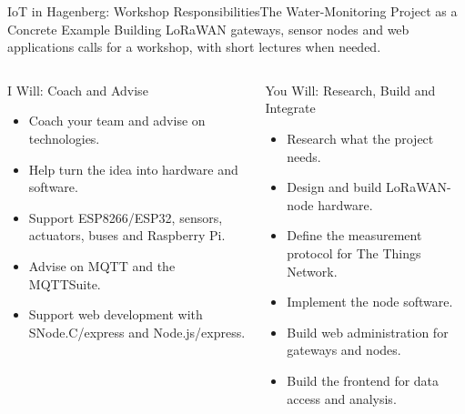 \begin{frame}{IoT in Hagenberg: Workshop Responsibilities}{The Water-Monitoring Project as a Concrete Example}
\small
Building LoRaWAN gateways, sensor nodes and web applications calls for a workshop, with short lectures when needed.
\medskip
\begin{columns}[T,onlytextwidth]
\begin{block}{I Will: Coach and Advise}
\begin{itemize}
\item Coach your team and advise on technologies.
\item Help turn the idea into hardware and software.
\item Support ESP8266/ESP32, sensors, actuators, buses and Raspberry Pi.
\item Advise on MQTT and the MQTTSuite.
\item Support web development with SNode.C/express and Node.js/express.
\end{itemize}
\end{block}
\begin{block}{You Will: Research, Build and Integrate}
\begin{itemize}
\item Research what the project needs.
\item Design and build LoRaWAN-node hardware.
\item Define the measurement protocol for The Things Network.
\item Implement the node software.
\item Build web administration for gateways and nodes.
\item Build the frontend for data access and analysis.
\end{itemize}
\end{block}
\end{columns}
\end{frame}

